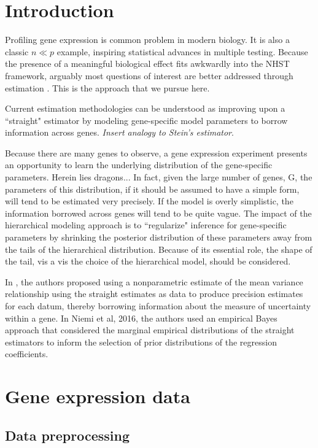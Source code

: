 
\section{Introduction}
Profiling gene expression is common problem in modern biology. It is also a classic $n \ll p$ example, inspiring statistical advances in multiple testing. Because the presence of a meaningful biological effect fits awkwardly into the NHST framework, arguably most questions of interest are better addressed through estimation \citet{deseq2014}. This is the approach that we pursue here.

Current estimation methodologies can be understood as improving upon a ``straight" estimator by modeling gene-specific model parameters to borrow information across genes. \textit{Insert analogy to Stein's estimator}.

Because there are many genes to observe, a gene expression experiment presents an opportunity to learn the underlying distribution of the gene-specific parameters. Herein lies dragons... In fact, given the large number of genes, G, the parameters of this distribution, if it should be assumed to have a simple form, will tend to be estimated very precisely. If the model is overly simplistic, the information borrowed across genes will tend to be quite vague. The impact of the hierarchical modeling approach is to ``regularize" inference for gene-specific parameters by shrinking the posterior distribution of these parameters away from the tails of the hierarchical distribution. Because of its essential role, the shape of the tail, vis a vis the choice of the hierarchical model, should be considered.

In \citet{voom}, the authors proposed using a nonparametric estimate of the mean variance relationship using the straight estimates as data to produce precision estimates for each datum, thereby borrowing information about the measure of uncertainty within a gene. In Niemi et al, 2016, the authors used an empirical Bayes approach that considered the marginal empirical distributions of the straight estimators to inform the selection of prior distributions of the regression coefficients.

\citet{liu}

\section{Gene expression data}
\subsection{Data preprocessing}
